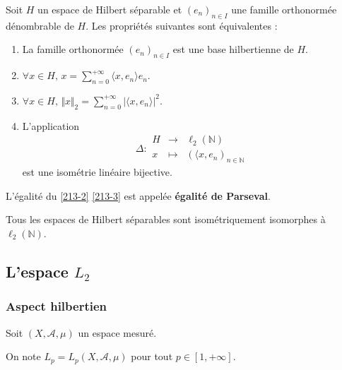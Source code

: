   \begin{theorem}
    \label{213-2}
    Soit $H$ un espace de Hilbert séparable et $(e_n)_{n \in I}$ une famille orthonormée dénombrable de $H$. Les propriétés suivantes sont équivalentes :
    \begin{enumerate}[label=(\roman*)]
      \item La famille orthonormée $(e_n)_{n \in I}$ est une base hilbertienne de $H$.
      \item $\forall x \in H, \, x = \sum_{n=0}^{+\infty} \langle x, e_n \rangle e_n$.
      \item \label{213-3} $\forall x \in H, \, \Vert x \Vert_2 = \sum_{n=0}^{+\infty} \vert \langle x, e_n \rangle \vert^2$.
      \item L'application
      \[
      \Delta :
      \begin{array}{ccc}
        H &\rightarrow& \ell_2(\mathbb{N}) \\
        x &\mapsto& (\langle x, e_n)_{n \in \mathbb{N}}
      \end{array}
      \]
      est une isométrie linéaire bijective.
    \end{enumerate}
  \end{theorem}

  \begin{remark}
    L'égalité du \cref{213-2} \cref{213-3} est appelée \textbf{égalité de Parseval}.
  \end{remark}


  \begin{corollary}
    Tous les espaces de Hilbert séparables sont isométriquement isomorphes à $\ell_2(\mathbb{N})$.
  \end{corollary}

  \subsection{L'espace \texorpdfstring{$L_2$}{L₂}}

  \subsubsection{Aspect hilbertien}


  Soit $(X, \mathcal{A}, \mu)$ un espace mesuré.

  \begin{notation}
    On note $L_p = L_p(X, \mathcal{A}, \mu)$ pour tout $p \in [1, +\infty]$.
  \end{notation}

